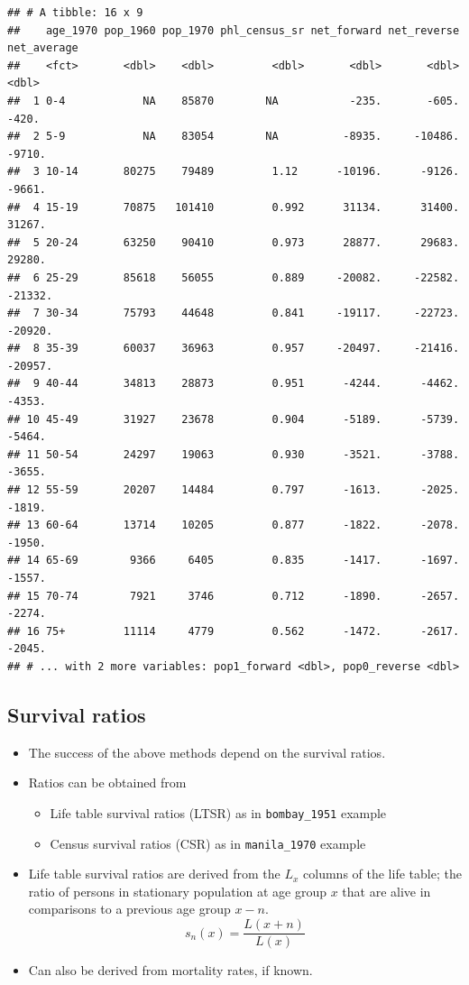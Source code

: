 \documentclass[
]{book}
\providecommand{\tightlist}{%
  \setlength{\itemsep}{0pt}\setlength{\parskip}{0pt}}
\begin{document}
\begin{verbatim}
## # A tibble: 16 x 9
##    age_1970 pop_1960 pop_1970 phl_census_sr net_forward net_reverse net_average
##    <fct>       <dbl>    <dbl>         <dbl>       <dbl>       <dbl>       <dbl>
##  1 0-4            NA    85870        NA           -235.       -605.       -420.
##  2 5-9            NA    83054        NA          -8935.     -10486.      -9710.
##  3 10-14       80275    79489         1.12      -10196.      -9126.      -9661.
##  4 15-19       70875   101410         0.992      31134.      31400.      31267.
##  5 20-24       63250    90410         0.973      28877.      29683.      29280.
##  6 25-29       85618    56055         0.889     -20082.     -22582.     -21332.
##  7 30-34       75793    44648         0.841     -19117.     -22723.     -20920.
##  8 35-39       60037    36963         0.957     -20497.     -21416.     -20957.
##  9 40-44       34813    28873         0.951      -4244.      -4462.      -4353.
## 10 45-49       31927    23678         0.904      -5189.      -5739.      -5464.
## 11 50-54       24297    19063         0.930      -3521.      -3788.      -3655.
## 12 55-59       20207    14484         0.797      -1613.      -2025.      -1819.
## 13 60-64       13714    10205         0.877      -1822.      -2078.      -1950.
## 14 65-69        9366     6405         0.835      -1417.      -1697.      -1557.
## 15 70-74        7921     3746         0.712      -1890.      -2657.      -2274.
## 16 75+         11114     4779         0.562      -1472.      -2617.      -2045.
## # ... with 2 more variables: pop1_forward <dbl>, pop0_reverse <dbl>
\end{verbatim}

\hypertarget{survival-ratios}{%
\subsection{Survival ratios}\label{survival-ratios}}

\begin{itemize}
\tightlist
\item
  The success of the above methods depend on the survival ratios.
\item
  Ratios can be obtained from

  \begin{itemize}
  \tightlist
  \item
    Life table survival ratios (LTSR) as in \texttt{bombay\_1951} example
  \item
    Census survival ratios (CSR) as in \texttt{manila\_1970} example
  \end{itemize}
\item
  Life table survival ratios are derived from the \(L_x\) columns of the life table; the ratio of persons in stationary population at age group \(x\) that are alive in comparisons to a previous age group \(x-n\).
  \[
  s_n(x) = \frac{L(x+n)}{L(x)}
  \]
\item
  Can also be derived from mortality rates, if known.
\end{itemize}
\end{document}
